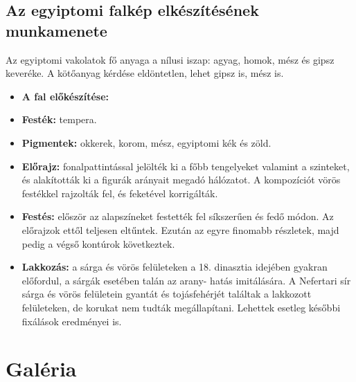 \subsection*{Az egyiptomi falkép elkészítésének munkamenete}

Az egyiptomi vakolatok fő anyaga a nílusi iszap: agyag, homok, mész és gipsz keveréke. A kötőanyag kérdése eldöntetlen, lehet gipsz is, mész is.

\begin{itemize}
	\item \textbf{A fal előkészítése:} 
	
	\item \textbf{Festék:} tempera.
	
	\item \textbf{Pigmentek:} okkerek, korom, mész, egyiptomi kék és zöld.
	
	\item \textbf{Előrajz:} fonalpattintással jelölték ki a főbb tengelyeket
	valamint a szinteket, és alakították ki a figurák arányait megadó hálózatot. A kompozíciót vörös festékkel rajzolták fel, és feketével korrigálták.
	
	\item \textbf{Festés:} először az alapszíneket festették fel síkszerűen és
	fedő módon. Az előrajzok ettől teljesen eltűntek. Ezután az egyre finomabb részletek, majd pedig a végső kontúrok következtek.
	
	\item \textbf{Lakkozás:} a sárga és vörös felületeken a 18. dinasztia idejében gyakran előfordul, a sárgák esetében talán az arany-
	hatás imitálására. A Nefertari sír sárga és vörös felületein gyantát és tojásfehérjét találtak a lakkozott felületeken, de korukat nem tudták megállapítani. Lehettek esetleg későbbi fixálások eredményei is.
\end{itemize}

\section{Galéria}


